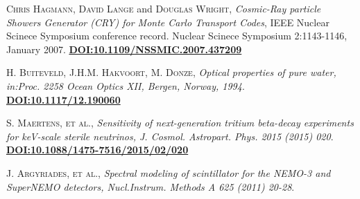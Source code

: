 \begin{thebibliography}{100}
 \textsc{Chris Hagmann}, \textsc{David Lange} and \textsc{Douglas Wright}, 
\textit{Cosmic-Ray particle Showers Generator (CRY) for Monte Carlo Transport Codes}, IEEE Nuclear Scinece Symposium conference record. Nuclear Scinece Symposium 2:1143-1146, January 2007. \href{https://www.researchgate.net/publication/4313740_Cosmic-ray_shower_generator_CRY_for_Monte_Carlo_transport_codes}{\textbf{DOI:10.1109/NSSMIC.2007.437209}}

 \textsc{H. Buiteveld}, \textsc{J.H.M. Hakvoort}, \textsc{M. Donze}, 
\textit{Optical properties of pure water, in:Proc. 2258 Ocean Optics XII, Bergen, Norway, 1994}. \href{https://www.spiedigitallibrary.org/conference-proceedings-of-spie/2258/1/Optical-properties-of-pure-water/10.1117/12.190060.short?SSO=1}{\textbf{DOI:10.1117/12.190060}}

 \textsc{S. Maertens}, \textsc{et al.},  \textit{Sensitivity of next-generation tritium beta-decay experiments for keV-scale sterile neutrinos, J. Cosmol. Astropart. Phys. 2015 (2015) 020}. \href{https://iopscience.iop.org/article/10.1088/1475-7516/2015/02/020}\textbf{DOI:10.1088/1475-7516/2015/02/020}

 \textsc{J. Argyriades}, \textsc{et al.},
\textit{Spectral modeling of scintillator for the NEMO-3 and SuperNEMO detectors, Nucl.Instrum. Methods A 625 (2011) 20-28}. \href{}{\textbf{}}

\end{thebibliography}